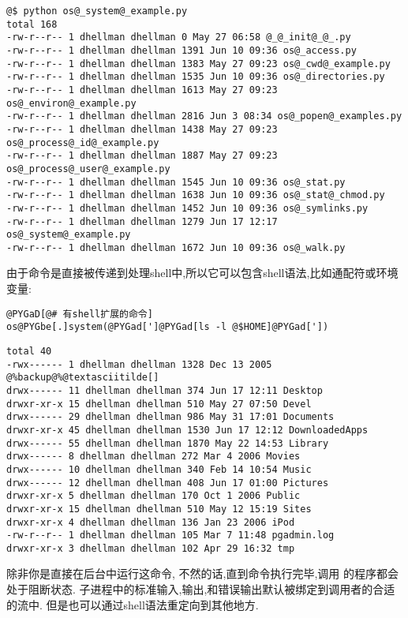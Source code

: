 \documentclass[a4paper,10pt,english]{manual}
\begin{document}
\begin{Verbatim}[commandchars=@\[\]]
@$ python os@_system@_example.py
total 168
-rw-r--r-- 1 dhellman dhellman 0 May 27 06:58 @_@_init@_@_.py
-rw-r--r-- 1 dhellman dhellman 1391 Jun 10 09:36 os@_access.py
-rw-r--r-- 1 dhellman dhellman 1383 May 27 09:23 os@_cwd@_example.py
-rw-r--r-- 1 dhellman dhellman 1535 Jun 10 09:36 os@_directories.py
-rw-r--r-- 1 dhellman dhellman 1613 May 27 09:23 os@_environ@_example.py
-rw-r--r-- 1 dhellman dhellman 2816 Jun 3 08:34 os@_popen@_examples.py
-rw-r--r-- 1 dhellman dhellman 1438 May 27 09:23 os@_process@_id@_example.py
-rw-r--r-- 1 dhellman dhellman 1887 May 27 09:23 os@_process@_user@_example.py
-rw-r--r-- 1 dhellman dhellman 1545 Jun 10 09:36 os@_stat.py
-rw-r--r-- 1 dhellman dhellman 1638 Jun 10 09:36 os@_stat@_chmod.py
-rw-r--r-- 1 dhellman dhellman 1452 Jun 10 09:36 os@_symlinks.py
-rw-r--r-- 1 dhellman dhellman 1279 Jun 17 12:17 os@_system@_example.py
-rw-r--r-- 1 dhellman dhellman 1672 Jun 10 09:36 os@_walk.py
\end{Verbatim}

由于命令是直接被传递到处理shell中,所以它可以包含shell语法,比如通配符或环境变量:

\begin{Verbatim}[commandchars=@\[\]]
@PYGaD[@# 有shell扩展的命令]
os@PYGbe[.]system(@PYGad[']@PYGad[ls -l @$HOME]@PYGad['])
\end{Verbatim}

\begin{Verbatim}[commandchars=@\[\]]
total 40
-rwx------ 1 dhellman dhellman 1328 Dec 13 2005 @%backup@%@textasciitilde[]
drwx------ 11 dhellman dhellman 374 Jun 17 12:11 Desktop
drwxr-xr-x 15 dhellman dhellman 510 May 27 07:50 Devel
drwx------ 29 dhellman dhellman 986 May 31 17:01 Documents
drwxr-xr-x 45 dhellman dhellman 1530 Jun 17 12:12 DownloadedApps
drwx------ 55 dhellman dhellman 1870 May 22 14:53 Library
drwx------ 8 dhellman dhellman 272 Mar 4 2006 Movies
drwx------ 10 dhellman dhellman 340 Feb 14 10:54 Music
drwx------ 12 dhellman dhellman 408 Jun 17 01:00 Pictures
drwxr-xr-x 5 dhellman dhellman 170 Oct 1 2006 Public
drwxr-xr-x 15 dhellman dhellman 510 May 12 15:19 Sites
drwxr-xr-x 4 dhellman dhellman 136 Jan 23 2006 iPod
-rw-r--r-- 1 dhellman dhellman 105 Mar 7 11:48 pgadmin.log
drwxr-xr-x 3 dhellman dhellman 102 Apr 29 16:32 tmp
\end{Verbatim}

除非你是直接在后台中运行这命令, 不然的话,直到命令执行完毕,调用  的程序都会处于阻断状态. 子进程中的标准输入,输出,和错误输出默认被绑定到调用者的合适的流中. 但是也可以通过shell语法重定向到其他地方.
\end{document}
